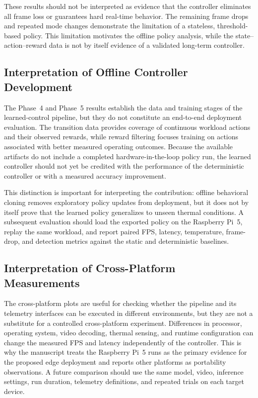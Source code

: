 \documentclass{ieeeaccess}
\begin{document}
\begin{highlight}
These results should not be interpreted as evidence that the controller
eliminates all frame loss or guarantees hard real-time behavior. The remaining
frame drops and repeated mode changes demonstrate the limitation of a
stateless, threshold-based policy. This limitation motivates the offline policy analysis, while the
state--action--reward data is not by itself evidence of a validated
long-term controller.
\end{highlight}

\subsection{Interpretation of Offline Controller Development}

The Phase~4 and Phase~5 results establish the data and training stages of the
learned-control pipeline, but they do not constitute an end-to-end deployment
evaluation. The transition data provides coverage of continuous workload
actions and their observed rewards, while reward filtering focuses training on
actions associated with better measured operating outcomes. Because the
available artifacts do not include a completed hardware-in-the-loop policy
run, the learned controller should not yet be credited with the performance
of the deterministic controller or with a measured accuracy improvement.

This distinction is important for interpreting the contribution: offline
behavioral cloning removes exploratory policy updates from deployment, but it
does not by itself prove that the learned policy generalizes to unseen thermal
conditions. A subsequent evaluation should load the exported policy on the
Raspberry Pi~5, replay the same workload, and report paired FPS, latency,
temperature, frame-drop, and detection metrics against the static and
deterministic baselines.

\subsection{Interpretation of Cross-Platform Measurements}

The cross-platform plots are useful for checking whether the pipeline and its
telemetry interfaces can be executed in different environments, but they are
not a substitute for a controlled cross-platform experiment. Differences in
processor, operating system, video decoding, thermal sensing, and runtime
configuration can change the measured FPS and latency independently of the
controller. This is why the manuscript treats the Raspberry Pi~5 runs as the
primary evidence for the proposed edge deployment and reports other platforms
as portability observations. A future comparison should use the same model,
video, inference settings, run duration, telemetry definitions, and repeated
trials on each target device.
\end{document}
